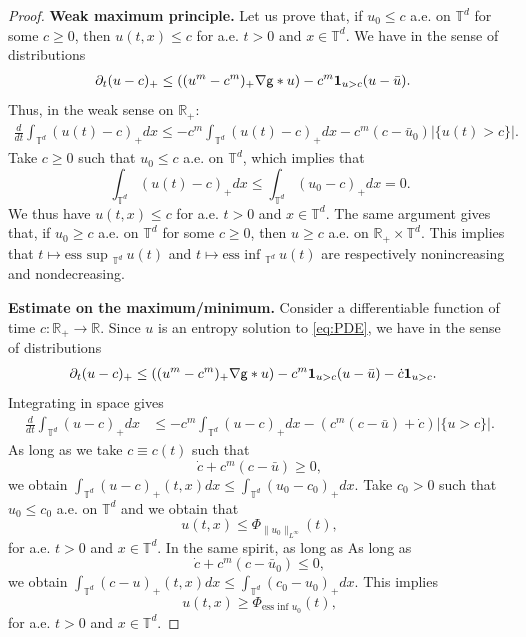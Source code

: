\documentclass[11pt]{article}
\numberwithin{equation}{section} %
\newcommand{\p}{{\partial}}
\newcommand{\R}{{\mathbb{R}}}
\newcommand{\T}{{\mathbb{T}}}
\newcommand{\g}{{\mathsf{g}}}
\let\div\relax
\DeclareMathOperator{\div}{\mathsf{div}}
\def\nab{\nabla}
\def\indic{\mathbf{1}}
\begin{document}
\begin{proof}
\textbf{Weak maximum principle.} Let us prove that, if $u_0\le c$ a.e. on $\T^d$ for some $c\ge 0$, then $u(t,x)\le c$ for a.e. $t>0$ and $x\in \T^d$. We have in the sense of distributions
\begin{align*}
    \p_t (u-c)_+ &\le \div((u^m-c^m)_+\nab\g\ast u) -c^m\indic_{u>c } (u-\bar u).
\end{align*}
Thus, in the weak sense on $\R_+$:
\begin{align*}
    \frac{d}{dt}\int_{\T^d}(u(t)-c)_+dx \le -c^m \int_{\T^d} (u(t)-c)_+dx -c^m(c-\bar u_0) |\{u(t)>c\}|.
\end{align*}
Take $c\ge 0$ such that $u_0 \le c$ a.e. on $\T^d$, which implies that
\begin{equation*}
    \int_{\T^d}(u(t)-c)_+dx  \le \int_{\T^d} (u_0-c)_+dx =0.
\end{equation*}
We thus have $u(t,x) \le c$ for a.e. $t>0$ and $x\in \T^d$. The same argument gives that, if $u_0\ge c$ a.e. on $\T^d$ for some $c\ge 0$, then $u\ge c$ a.e. on $\R_+\times \T^d$. This implies that $t\mapsto \text{ess sup }_{\T^d }\  u(t)$ and $t\mapsto \text{ess inf }_{\T^d }\  u(t)$ are respectively nonincreasing and nondecreasing.

\bigbreak
\textbf{Estimate on the maximum/minimum.}
    Consider a differentiable function of time $c:\R_+\to \R$. Since $u$ is an entropy solution to \eqref{eq:PDE}, we have in the sense of distributions 
    \begin{align*}
        \p_t (u-c)_+ &\le \div((u^m-c^m)_+\nab\g\ast u)  -c^m\indic_{u>c } (u-\bar u) -\dot c \indic_{u>c}.
    \end{align*}
    Integrating in space gives
    \begin{align*}
        \frac{d}{dt}\int_{\T^d} (u-c)_+dx &\le -c^m \int_{\T^d} (u-c)_+ dx - (c^m (c-\bar u) + \dot c) |\{u>c\}|.
    \end{align*}
    As long as we take $c\equiv c(t)$ such that
    \begin{equation*}
        \dot c + c^m(c-\bar u) \ge 0,
    \end{equation*}
    we obtain $\int_{\T^d} (u-c)_+(t,x)dx \le \int_{\T^d} (u_0-c_0)_+ dx$. Take $c_0>0$ such that $u_0 \le c_0$ a.e. on $\T^d$ and we obtain that 
    \begin{equation*}
        u(t,x)\le \Phi_{\|u_0\|_{L^\infty}}(t),
    \end{equation*}
    for a.e. $t>0$ and $x\in \T^d$. In the same spirit, as long as
    As long as 
    \begin{equation*}
        \dot c + c^m(c-\bar u_0) \le 0,
    \end{equation*}
    we obtain $\int_{\T^d} (c-u)_+(t,x)dx \le \int_{\T^d} (c_0-u_0)_+ dx$. This implies
    \begin{equation*}
        u(t,x)\ge \Phi_{\text{ess inf }u_0}(t),
    \end{equation*}
    for a.e. $t>0$ and $x\in \T^d$.


\end{proof}
\end{document}
